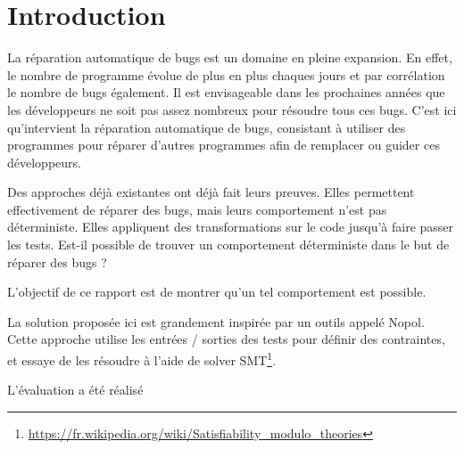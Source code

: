 \chapter*{Introduction}
	\thispagestyle{introduction}


\par La réparation automatique de bugs est un domaine en pleine expansion. En effet, le nombre de programme évolue de plus en plus chaques jours et par corrélation le nombre de bugs également. Il est envisageable dans les prochaines années que les développeurs ne soit pas assez nombreux pour résoudre tous ces bugs. C'est ici qu'intervient la réparation automatique de bugs, consistant à utiliser des programmes pour réparer d'autres programmes afin de remplacer ou guider ces développeurs.  

\par Des approches déjà existantes\cite{genprog}\cite{semfix} ont déjà fait leurs preuves. Elles permettent effectivement de réparer des bugs, mais leurs comportement n'est pas déterministe. Elles appliquent des transformations sur le code jusqu'à faire passer les tests. Est-il possible de trouver un comportement déterministe dans le but de réparer des bugs ?

\par L'objectif de ce rapport est de montrer qu'un tel comportement est possible.

\par La solution proposée ici est grandement inspirée par un outils appelé Nopol\cite{nopol}. Cette approche utilise les entrées / sorties des tests pour définir des contraintes, et essaye de les résoudre à l'aide de solver SMT\footnote{\url{https://fr.wikipedia.org/wiki/Satisfiability_modulo_theories}}.


\par L'évaluation a été réalisé